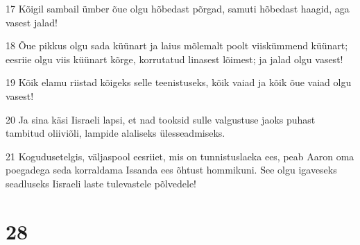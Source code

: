 \par 17 Kõigil sambail ümber õue olgu hõbedast põrgad, samuti hõbedast haagid, aga vasest jalad!
\par 18 Õue pikkus olgu sada küünart ja laius mõlemalt poolt viiskümmend küünart; eesriie olgu viis küünart kõrge, korrutatud linasest lõimest; ja jalad olgu vasest!
\par 19 Kõik elamu riistad kõigeks selle teenistuseks, kõik vaiad ja kõik õue vaiad olgu vasest!
\par 20 Ja sina käsi Iisraeli lapsi, et nad tooksid sulle valgustuse jaoks puhast tambitud oliiviõli, lampide alaliseks ülesseadmiseks.
\par 21 Kogudusetelgis, väljaspool eesriiet, mis on tunnistuslaeka ees, peab Aaron oma poegadega seda korraldama Issanda ees õhtust hommikuni. See olgu igaveseks seadluseks Iisraeli laste tulevastele põlvedele!

\chapter{28}

